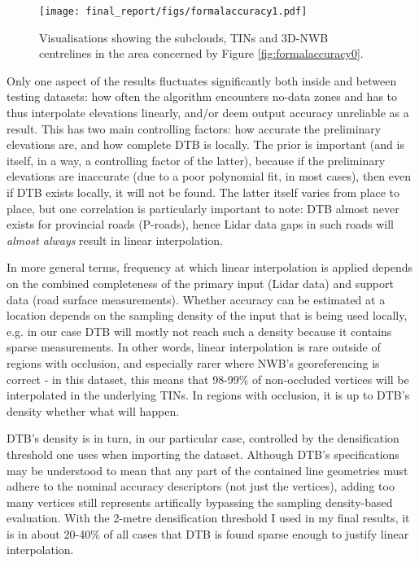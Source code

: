 \begin{figure}[]
    \centering
    \texttt{[image: final\_report/figs/formalaccuracy1.pdf]}
    \caption{Visualisations showing the subclouds, TINs and 3D-NWB centrelines in the area concerned by Figure \ref{fig:formalaccuracy0}.}
    \label{fig:formalaccuracy1}
\end{figure}

Only one aspect of the results fluctuates significantly both inside and between testing datasets: how often the algorithm encounters no-data zones and has to thus interpolate elevations linearly, and/or deem output accuracy unreliable as a result. This has two main controlling factors: how accurate the preliminary elevations are, and how complete DTB is locally. The prior is important (and is itself, in a way, a controlling factor of the latter), because if the preliminary elevations are inaccurate (due to a poor polynomial fit, in most cases), then even if DTB exists locally, it will not be found. The latter itself varies from place to place, but one correlation is particularly important to note: DTB almost never exists for provincial roads (P-roads), hence Lidar data gaps in such roads will \textit{almost always} result in linear interpolation.

In more general terms, frequency at which linear interpolation is applied depends on the combined completeness of the primary input (Lidar data) and support data (road surface measurements). Whether accuracy can be estimated at a location depends on the sampling density of the input that is being used locally, e.g. in our case DTB will mostly not reach such a density because it contains sparse measurements. In other words, linear interpolation is rare outside of regions with occlusion, and especially rarer where NWB's georeferencing is correct - in this dataset, this means that 98-99\% of non-occluded vertices will be interpolated in the underlying TINs. In regions with occlusion, it is up to DTB's density whether what will happen.

DTB's density is in turn, in our particular case, controlled by the densification threshold one uses when importing the dataset. Although DTB's specifications may be understood to mean that any part of the contained line geometries must adhere to the nominal accuracy descriptors (not just the vertices), adding too many vertices still represents artifically bypassing the sampling density-based evaluation. With the 2-metre densification threshold I used in my final results, it is in about 20-40\% of all cases that DTB is found sparse enough to justify linear interpolation.

